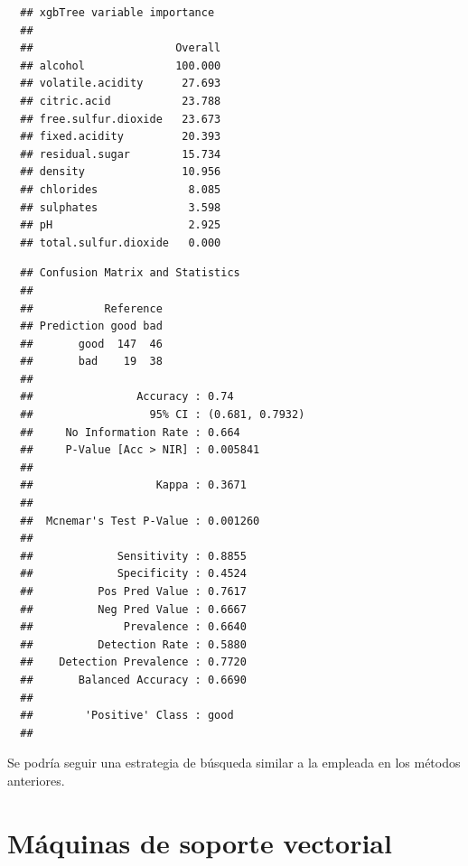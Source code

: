 \documentclass[
]{book}
\newenvironment{Shaded}{\begin{snugshade}}{\end{snugshade}}
\newcommand{\AttributeTok}[1]{\textcolor[rgb]{0.77,0.63,0.00}{#1}}
\newcommand{\FunctionTok}[1]{\textcolor[rgb]{0.00,0.00,0.00}{#1}}
\newcommand{\NormalTok}[1]{#1}
\newcommand{\SpecialCharTok}[1]{\textcolor[rgb]{0.00,0.00,0.00}{#1}}
\theoremstyle{break}
\theoremstyle{nonumberplain}
\begin{document}
\begin{verbatim}
  ## xgbTree variable importance
  ## 
  ##                      Overall
  ## alcohol              100.000
  ## volatile.acidity      27.693
  ## citric.acid           23.788
  ## free.sulfur.dioxide   23.673
  ## fixed.acidity         20.393
  ## residual.sugar        15.734
  ## density               10.956
  ## chlorides              8.085
  ## sulphates              3.598
  ## pH                     2.925
  ## total.sulfur.dioxide   0.000
\end{verbatim}

\begin{Shaded}
\end{Shaded}

\begin{verbatim}
  ## Confusion Matrix and Statistics
  ## 
  ##           Reference
  ## Prediction good bad
  ##       good  147  46
  ##       bad    19  38
  ##                                          
  ##                Accuracy : 0.74           
  ##                  95% CI : (0.681, 0.7932)
  ##     No Information Rate : 0.664          
  ##     P-Value [Acc > NIR] : 0.005841       
  ##                                          
  ##                   Kappa : 0.3671         
  ##                                          
  ##  Mcnemar's Test P-Value : 0.001260       
  ##                                          
  ##             Sensitivity : 0.8855         
  ##             Specificity : 0.4524         
  ##          Pos Pred Value : 0.7617         
  ##          Neg Pred Value : 0.6667         
  ##              Prevalence : 0.6640         
  ##          Detection Rate : 0.5880         
  ##    Detection Prevalence : 0.7720         
  ##       Balanced Accuracy : 0.6690         
  ##                                          
  ##        'Positive' Class : good           
  ## 
\end{verbatim}

Se podría seguir una estrategia de búsqueda similar a la empleada en los métodos anteriores.

\hypertarget{svm}{%
\chapter{Máquinas de soporte vectorial}\label{svm}}
\end{document}
